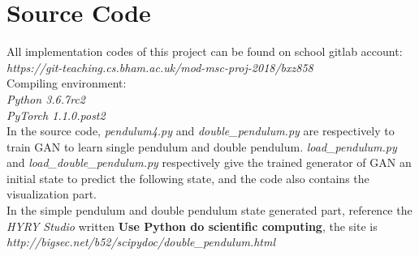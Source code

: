 \documentclass[11pt,a4paper]{article}
\begin{document}
\section{Source Code}
All implementation codes of this project can be found on school gitlab account:
\\
\textit{https://git-teaching.cs.bham.ac.uk/mod-msc-proj-2018/bxz858}
\\
Compiling environment:
\\
\textit{Python 3.6.7rc2}
\\
\textit{PyTorch 1.1.0.post2}
\\
\newline
In the source code, \textit{pendulum4.py} and \textit{double\_pendulum.py} are respectively to train GAN to learn single pendulum and double pendulum. \textit{load\_pendulum.py} and \textit{load\_double\_pendulum.py} respectively give the trained generator of GAN an initial state to predict the following state, and the code also contains the visualization part.
\\
\newline
In the simple pendulum and double pendulum state generated part, reference the \textit{HYRY Studio} written \textbf{Use Python do scientific computing}, the site is \textit{http://bigsec.net/b52/scipydoc/double\_pendulum.html}
\end{document}
